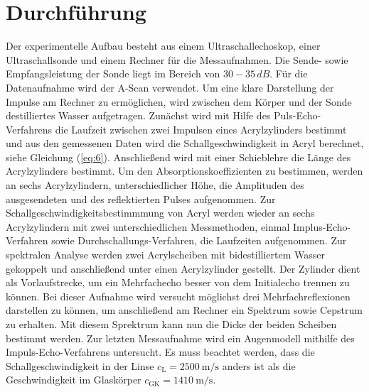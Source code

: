 \section{Durchführung}
Der experimentelle Aufbau besteht aus einem Ultraschallechoskop, einer Ultraschallsonde und einem Rechner für die Messaufnahmen.
Die Sende- sowie Empfangsleistung der Sonde liegt im Bereich von $30 - 35\, dB$. Für die Datenaufnahme wird der A-Scan verwendet.
Um eine klare Darstellung der Impulse am Rechner zu ermöglichen, wird zwischen dem Körper und der Sonde destilliertes Wasser aufgetragen.
Zunächst wird mit Hilfe des Puls-Echo-Verfahrens die Laufzeit zwischen zwei Impulsen eines Acrylzylinders bestimmt und aus den gemessenen
Daten wird die Schallgeschwindigkeit in Acryl berechnet, siehe Gleichung (\ref{eq:6}).
Anschließend wird mit einer Schieblehre die Länge des Acrylzylinders bestimmt.
Um den Absorptionskoeffizienten zu bestimmen, werden an sechs Acrylzylindern, unterschiedlicher Höhe, die Amplituden des ausgesendeten und des reflektierten Pulses aufgenommen.
Zur Schallgeschwindigkeitsbestimmmung von Acryl werden wieder an sechs Acrylzylindern mit zwei unterschiedlichen Messmethoden, einmal Implus-Echo-Verfahren sowie Durchschallungs-Verfahren,
die Laufzeiten aufgenommen.
\newline
Zur spektralen Analyse werden zwei Acrylscheiben mit bidestilliertem Wasser gekoppelt und anschließend unter einen Acrylzylinder gestellt.
Der Zylinder dient als Vorlaufstrecke, um ein Mehrfachecho besser von dem Initialecho trennen zu können. Bei dieser Aufnahme wird versucht möglichst drei
Mehrfachreflexionen darstellen zu können, um anschließend am Rechner ein Spektrum sowie Cepstrum zu erhalten. Mit diesem Sprektrum kann nun die Dicke
der beiden Scheiben bestimmt werden.
Zur letzten Messaufnahme wird ein Augenmodell mithilfe des Impuls-Echo-Verfahrens untersucht. Es muss beachtet werden, dass die Schallgeschwindigkeit in der Linse
$c_\text{L} = \SI{2500}{\metre\per\second}$ anders ist als die Geschwindigkeit im Glaskörper $c_\text{GK} = \SI{1410}{\metre\per\second}$.
